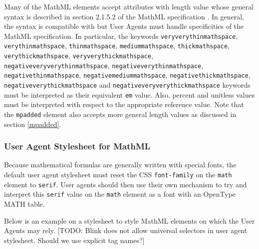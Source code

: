 Many of the MathML elements accept attributes with length value whose
general syntax is described in section 2.1.5.2 of the MathML specification
\cite{MathML3}. In general,
the syntax is compatible with \cite{CSS2} but User Agents must handle
specificities of the MathML specification. In particular, the keywords
{\tt veryverythinmathspace},
{\tt verythinmathspace},
{\tt thinmathspace},
{\tt mediummathspace},
{\tt thickmathspace},
{\tt verythickmathspace},
{\tt veryverythickmathspace},
{\tt negativeveryverythinmathspace},
{\tt negativeverythinmathspace},
{\tt negativethinmathspace},
{\tt negativemediummathspace},
{\tt negativethickmathspace},
{\tt negativeverythickmathspace} and
{\tt negativeveryverythickmathspace} keywords must be interpreted as their
equivalent {\tt em} value. Also, percent and unitless values must be interpreted
with respect to the appropriate reference value. Note that the {\tt mpadded}
element also accepts more general length values as discussed in section
\ref{mpadded}.

\subsubsection{User Agent Stylesheet for MathML}\label{UAStylesheet}

Because mathematical formulas are generally written with special fonts, the
default user agent stylesheet must reset the CSS {\tt font-family} on the
{\tt math} element to {\tt serif}. User agents should then use their own
mechanism to try and interpret this {\tt serif} value on the {\tt math} element
as a font with an OpenType MATH table.

Below is an example on a stylesheet to style MathML elements on which the
User Agents may rely.
[TODO: Blink does not allow universal selectors in user agent
stylesheet. Should we use explicit tag names?]

